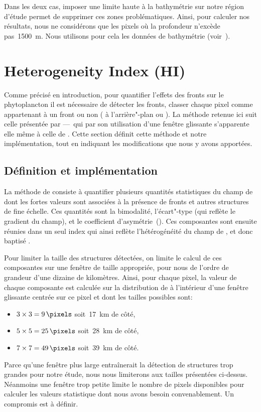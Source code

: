 Dans les deux cas, imposer une limite haute à la bathymétrie sur notre région d'étude permet de supprimer ces zones problématiques.
Ainsi, pour calculer nos résultats, nous ne considérons que les pixels où la profondeur n'excède pas~\qty{1500}{\m}.
Nous utilisons pour cela les données de bathymétrie  (voir~).

\section{Heterogeneity Index (HI)}
\label{sec:HI}

Comme précisé en introduction, pour quantifier l'effets des fronts sur le phytoplancton il est nécessaire de détecter les fronts,  classer chaque pixel comme appartenant à un front ou non ( à l'arrière"-plan ou ).
La méthode retenue ici suit celle présentée par \textcite{liu_2016} ---~qui par son utilisation d'une fenêtre glissante s'apparente elle même à celle de \textcite{cayula_1992}.
Cette section définit cette méthode et notre implémentation, tout en indiquant les modifications que nous y avons apportées.

\subsection{Définition et implémentation}
\label{sec:HI-definition}

La méthode de \textcite{liu_2016} consiste à quantifier plusieurs quantités statistiques du champ de  dont les fortes valeurs sont associées à la présence de fronts et autres structures de fine échelle.
Ces quantités sont la bimodalité, l'écart"-type (qui reflète le gradient du champ), et le coefficient d'asymétrie~().
Ces composantes sont ensuite réunies dans un seul index qui ainsi reflète l'hétérogénéité du champ de , et donc baptisé .

Pour limiter la taille des structures détectées, on limite le calcul de ces composantes sur une fenêtre de taille appropriée,  pour nous de l'ordre de grandeur d'une dizaine de kilomètres.
Ainsi, pour chaque pixel, la valeur de chaque composante est calculée sur la distribution de  à l'intérieur d'une fenêtre glissante centrée sur ce pixel et dont les tailles possibles sont:
\begin{itemize}
        \item \(3 \times 3 =\qty{9}{\pixels}\) soit~\qty{17}{\km} de côté,
        \item \(5 \times 5 =\qty{25}{\pixels}\) soit~\qty{28}{\km} de côté,
        \item \(7 \times 7 =\qty{49}{\pixels}\) soit~\qty{39}{\km} de côté.
\end{itemize}
Parce qu'une fenêtre plus large entraînerait la détection de structures trop grandes pour notre étude, nous nous limiterons aux tailles présentées ci-dessus.
Néanmoins une fenêtre trop petite limite le nombre de pixels disponibles pour calculer les valeurs statistique dont nous avons besoin convenablement.
Un compromis est à définir.

